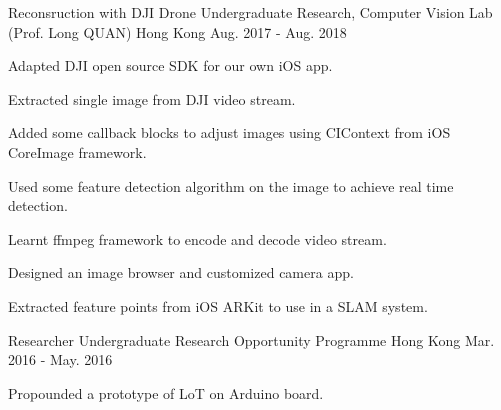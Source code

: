 \begin{cventries}
\cventry
{Reconsruction with DJI Drone} %
{Undergraduate Research, Computer Vision Lab  (Prof. Long QUAN)} %
{Hong Kong} %
{Aug. 2017 - Aug. 2018} %
{ %
\begin{cvitems}
\item {Adapted DJI open source SDK for our own iOS app.}
\item {Extracted single image from DJI video stream.}
\item {Added some callback blocks to adjust images using CIContext from iOS CoreImage framework.}
\item {Used some feature detection algorithm on the image to achieve real time detection.}
\item {Learnt ffmpeg framework to encode and decode video stream.}
\item {Designed an image browser and customized camera app.}
\item {Extracted feature points from iOS ARKit to use in a SLAM system.}
\end{cvitems}
}


\cventry
{Researcher} %
{Undergraduate Research Opportunity Programme} %
{Hong Kong} %
{Mar. 2016 - May. 2016} %
{ %
\begin{cvitems}
\item {Propounded a prototype of LoT on Arduino board.}
\end{cvitems} 
}





\end{cventries}